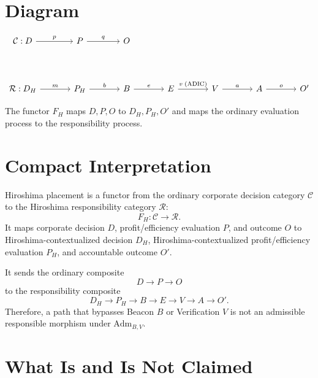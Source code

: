 \documentclass[11pt]{article}
\begin{document}
\section*{Diagram}

\[
\begin{tikzcd}[column sep=large,row sep=large]
\mathcal{C}:
  D \arrow[r,"p"] & P \arrow[r,"q"] & O
\\[1.5em]
\mathcal{R}:
  D_H \arrow[r,"m"] &
  P_H \arrow[r,"b"] &
  B \arrow[r,"e"] &
  E \arrow[r,"v\;(\mathrm{ADIC})"] &
  V \arrow[r,"a"] &
  A \arrow[r,"o"] &
  O'
\end{tikzcd}
\]

The functor $F_H$ maps $D,P,O$ to $D_H,P_H,O'$ and maps the ordinary evaluation
process to the responsibility process.

\section*{Compact Interpretation}

Hiroshima placement is a functor from the ordinary corporate decision category
$\mathcal{C}$ to the Hiroshima responsibility category $\mathcal{R}$:
\[
  F_H:\mathcal{C}\to\mathcal{R}.
\]
It maps corporate decision $D$, profit/efficiency evaluation $P$, and outcome
$O$ to Hiroshima-contextualized decision $D_H$, Hiroshima-contextualized
profit/efficiency evaluation $P_H$, and accountable outcome $O'$.

It sends the ordinary composite
\[
  D\to P\to O
\]
to the responsibility composite
\[
  D_H\to P_H\to B\to E\to V\to A\to O'.
\]
Therefore, a path that bypasses Beacon $B$ or Verification $V$ is not an
admissible responsible morphism under $\mathrm{Adm}_{B,V}$.

\section*{What Is and Is Not Claimed}
\end{document}

